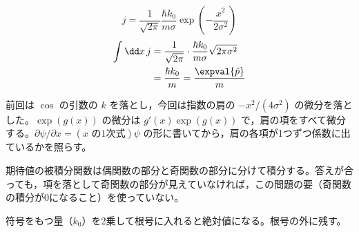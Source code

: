 \[ j=\frac{1}{\sqrt{2\pi}}\frac{\hbar k_{0}}{m\sigma}\exp\left(-\frac{x^{2}}{2\sigma^{2}}\right) \]
\begin{align*}
\int\dd x\,j&=\frac{1}{\sqrt{2\pi}}\cdot\frac{\hbar k_{0}}{m\sigma}\sqrt{2\pi\sigma^{2}}\\
&=\frac{\hbar k_{0}}{m}=\frac{\expval{\hat{p}}}{m}
\end{align*}
\item {} 前回は $\cos$ の引数の $k$ を落とし，今回は指数の肩の $-x^{2}/(4\sigma^{2})$ の微分を落とした。$\exp(g(x))$ の微分は $g'(x)\exp(g(x))$ で，肩の項をすべて微分する。$\partial\psi/\partial x=(\text{$x$ の1次式})\psi$ の形に書いてから，肩の各項が1つずつ係数に出ているかを照らす。
\item 期待値の被積分関数は偶関数の部分と奇関数の部分に分けて積分する。答えが合っても，項を落として奇関数の部分が見えていなければ，この問題の要（奇関数の積分が0になること）を使っていない。
\item 符号をもつ量（$k_{0}$）を2乗して根号に入れると絶対値になる。根号の外に残す。
